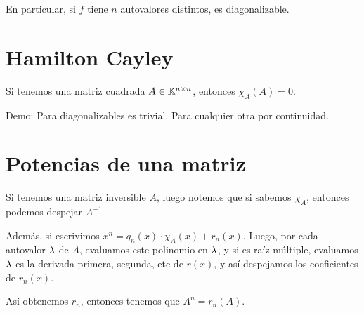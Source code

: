 \documentclass{article}
\begin{document}
En particular, si $f$ tiene $n$ autovalores distintos, es diagonalizable.

\section*{Hamilton Cayley}
Si tenemos una matriz cuadrada $A \in \mathbb{K}^{n \times n}$, entonces $\chi_A(A) = 0$.

Demo:
Para diagonalizables es trivial.
Para cualquier otra por continuidad.

\section*{Potencias de una matriz}
Si tenemos una matriz inversible $A$, luego notemos que si sabemos $\chi_A$, entonces podemos despejar $A^{-1}$

Además, si escrivimos $x^n = q_n(x) \cdot \chi_A(x) + r_n(x)$. Luego, por cada autovalor $\lambda$ de $A$, evaluamos este polinomio en $\lambda$, y si es raíz múltiple, evaluamos $\lambda$ es la derivada primera, segunda, etc de $r(x)$, y así despejamos los coeficientes de $r_n(x)$.

Así obtenemos $r_n$, entonces tenemos que $A^n = r_n(A)$.
\end{document}
